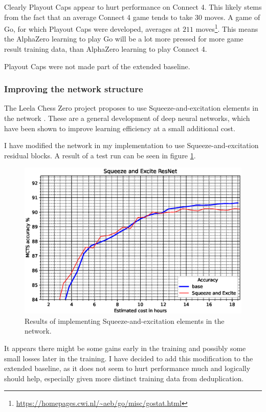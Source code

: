 \documentclass[12pt,onecolumn,oneside,titlepage]{article}
\begin{document}
Clearly Playout Caps appear to hurt performance on Connect 4. This likely stems from the fact that an average Connect 4 game tends to take $30$ moves. A game of Go, for which Playout Caps were developed, averages at $211$ moves\footnote{\url{https://homepages.cwi.nl/~aeb/go/misc/gostat.html}}.
This means the AlphaZero learning to play Go will be a lot more pressed for more game result training data, than AlphaZero learning to play Connect 4.

Playout Caps were not made part of the extended baseline.

\subsubsection{Improving the network structure}

The Leela Chess Zero project \cite{leela0sq} proposes to use Squeeze-and-excitation elements in the network \cite{hu2018squeeze}.
These are a general development of deep neural networks, which have been shown to improve learning efficiency at a small additional cost.

I have modified the network in my implementation to use Squeeze-and-excitation residual blocks. A result of a test run can be seen in figure \ref{fig:sqnet}. 

\begin{figure}[H]
\centering
\includegraphics[clip,width=\columnwidth]{sqnet}
\caption{Results of implementing Squeeze-and-excitation elements in the network.}
\label{fig:sqnet}
\end{figure}

It appears there might be some gains early in the training and possibly some small losses later in the training. I have decided to add this modification to the extended baseline, as it does not seem to hurt performance much and 
logically should help, especially given more distinct training data from deduplication.
\end{document}

